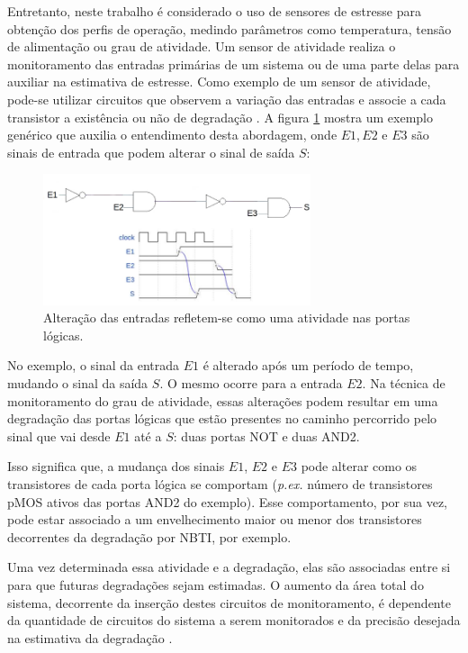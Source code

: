 Entretanto, neste trabalho é considerado o uso de sensores de estresse para obtenção dos perfis de operação, medindo parâmetros como temperatura, tensão de alimentação ou grau de atividade. Um sensor de atividade realiza o monitoramento das entradas primárias de um sistema ou de uma parte delas para auxiliar na estimativa de estresse. Como exemplo de um sensor de atividade, pode-se utilizar circuitos que observem a variação das entradas e associe a cada transistor a existência ou não de degradação \cite{Baranowski2015}. A figura \ref{figure:monitor_atividades} mostra um exemplo genérico que auxilia o entendimento desta abordagem, onde $E1, E2$ e $E3$ são sinais de entrada que podem alterar o sinal de saída $S$:
\begin{figure}[H]
	\center
	\includegraphics[width=0.7\textwidth]{images/monitor_atividades}
	\caption{Alteração das entradas refletem-se como uma atividade nas portas lógicas.}
	\label{figure:monitor_atividades}
\end{figure}

No exemplo, o sinal da entrada $E1$ é alterado após um período de tempo, mudando o sinal da saída $S$. O mesmo ocorre para a entrada $E2$. Na técnica de monitoramento do grau de atividade, essas alterações podem resultar em uma degradação das portas lógicas que estão presentes no caminho percorrido pelo sinal que vai desde $E1$ até a $S$: duas portas NOT e duas AND2.

Isso significa que, a mudança dos sinais $E1$, $E2$ e $E3$ pode alterar como os transistores de cada porta lógica se comportam (\textit{p.ex.} número de transistores pMOS ativos das portas AND2 do exemplo). Esse comportamento, por sua vez, pode estar associado a um envelhecimento maior ou menor dos transistores decorrentes da degradação por NBTI, por exemplo.

Uma vez determinada essa atividade e a degradação, elas são associadas entre si para que futuras degradações sejam estimadas. O aumento da área total do sistema, decorrente da inserção destes circuitos de monitoramento, é dependente da quantidade de circuitos do sistema a serem monitorados e da precisão desejada na estimativa da degradação \cite{Baranowski2015}.

